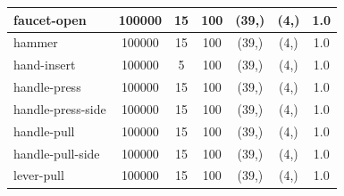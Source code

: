 \documentclass{article}
\theoremstyle{plain}
\theoremstyle{definition}
\theoremstyle{remark}
\begin{document}
\begin{table}[]
{\begin{tabular}{|l|c|c|c|c|c|c|}
faucet-open                         & 100000                                        & 15                                                   & 100                                             & (39,)                                           & (4,) & 1.0                                            \\ \hline
hammer                              & 100000                                        & 15                                                   & 100                                             & (39,)                                           & (4,) & 1.0                                            \\ \hline
hand-insert                         & 100000                                        & 5                                                    & 100                                             & (39,)                                           & (4,) & 1.0                                            \\ \hline
handle-press                        & 100000                                        & 15                                                   & 100                                             & (39,)                                           & (4,) & 1.0                                            \\ \hline
handle-press-side                   & 100000                                        & 15                                                   & 100                                             & (39,)                                           & (4,) & 1.0                                            \\ \hline
handle-pull                         & 100000                                        & 15                                                   & 100                                             & (39,)                                           & (4,) & 1.0                                            \\ \hline
handle-pull-side                    & 100000                                        & 15                                                   & 100                                             & (39,)                                           & (4,) & 1.0                                            \\ \hline
lever-pull                          & 100000                                        & 15                                                   & 100                                             & (39,)                                           & (4,) & 1.0                                            \\ \hline

\end{tabular}}
\end{table}
\end{document}

